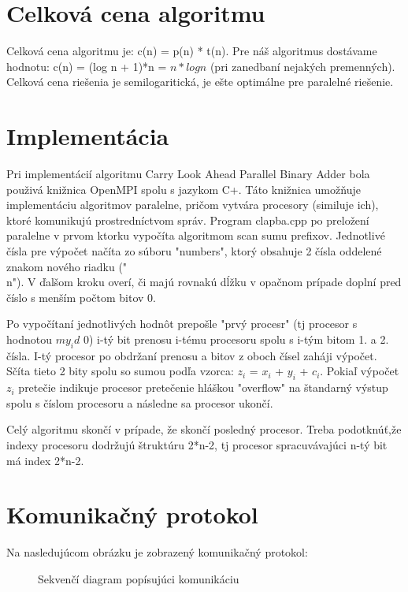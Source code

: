 \documentclass[11pt,a4paper,titlepage,final]{article}
\begin{document}
\section{Celková cena algoritmu}
Celková cena algoritmu je: c(n) = p(n) * t(n). Pre náš algoritmus dostávame hodnotu: c(n) = (log n + 1)*n = $n * log n$ (pri zanedbaní nejakých premenných). Celková cena riešenia je semilogaritická, je ešte optimálne pre paralelné riešenie.

\section{Implementácia}
Pri implementácií algoritmu Carry Look Ahead Parallel Binary Adder bola použivá knižnica OpenMPI spolu s jazykom C+. Táto knižnica umožňuje implementáciu algoritmov paralelne, pričom vytvára procesory (similuje ich), ktoré komunikujú prostredníctvom správ. Program clapba.cpp po preložení paralelne v prvom ktorku vypočíta algoritmom scan sumu prefixov. Jednotlivé čísla pre výpočet načíta zo súboru "numbers", ktorý obsahuje 2 čísla oddelené znakom nového riadku ("\\n"). V ďalšom kroku overí, či majú rovnakú dĺžku v opačnom prípade doplní pred číslo s menším počtom bitov 0.

Po vypočítaní jednotlivých hodnôt prepošle "prvý procesr" (tj procesor s hodnotou $my_id$ 0) i-tý bit prenosu i-tému procesoru spolu s i-tým bitom 1. a 2. čísla. I-tý procesor po obdržaní prenosu a bitov z oboch čísel zaháji výpočet.
Sčíta tieto 2 bity spolu so sumou podľa vzorca: $z_i$ = $x_i$ + $y_i$ + $c_i$. Pokiaľ výpočet $z_i$ pretečie indikuje procesor pretečenie hláškou "overflow" na štandarný výstup spolu s číslom procesoru a následne sa procesor ukončí.

Celý algoritmu skončí v prípade, že skončí posledný procesor. Treba podotknúť,že indexy procesoru dodržujú štruktúru 2*n-2, tj procesor spracuvávajúci n-tý bit má index 2*n-2.

\section{Komunikačný protokol}
Na nasledujúcom obrázku je zobrazený komunikačný protokol:
 \begin{figure}[h]

\begin{center}
\caption{Sekvenčí diagram popísujúci komunikáciu}
\end{center}

\end{figure}
\end{document}
